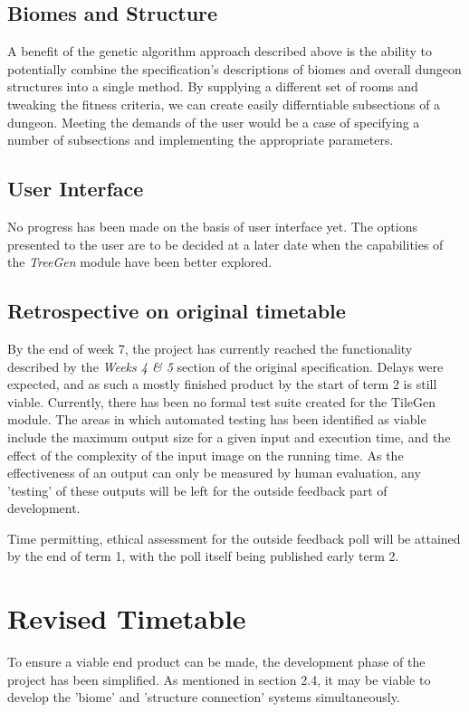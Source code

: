 \documentclass{article}
\begin{document}
\subsection{Biomes and Structure}
A benefit of the genetic algorithm approach described above is the ability to potentially combine the specification's descriptions of biomes and overall dungeon structures into a single method. By supplying a different set of rooms and tweaking the fitness criteria, we can create easily differntiable subsections of a dungeon. Meeting the demands of the user would be a case of specifying a number of subsections and implementing the appropriate parameters.

\subsection{User Interface}
No progress has been made on the basis of user interface yet. The options presented to the user are to be decided at a later date when the capabilities of the \textit{TreeGen} module have been better explored. 


\subsection{Retrospective on original timetable}
By the end of week 7, the project has currently reached the functionality described by the \textit{Weeks 4 \& 5} section of the original specification. Delays were expected, and as such a mostly finished product by the start of term 2 is still viable. Currently, there has been no formal test suite created for the TileGen module. The areas in which automated testing has been identified as viable include the maximum output size for a given input and execution time, and the effect of the complexity of the input image on the running time. As the effectiveness of an output can only be measured by human evaluation, any 'testing' of these outputs will be left for the outside feedback part of development. 



Time permitting, ethical assessment for the outside feedback poll will be attained by the end of term 1, with the poll itself being published early term 2. 


\section{Revised Timetable}
To ensure a viable end product can be made, the development phase of the project has been simplified. As mentioned in section 2.4, it may be viable to develop the 'biome' and 'structure connection' systems simultaneously. 
\end{document}
